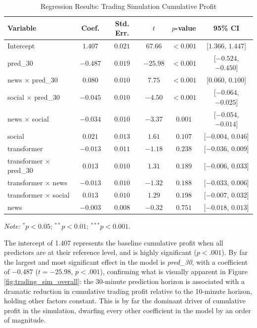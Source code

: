 \documentclass[stu,floatsintext]{apa7}
\begin{document}
\begin{table}[htbp]
\centering
\caption{Regression Results: Trading Simulation Cumulative Profit}
\label{tab:trading_sim_regression}
\begin{tabular}{lccccc}
\toprule
Variable & Coef. & Std. Err. & $t$ & $p$-value & 95\% CI \\
\midrule
Intercept                  & $1.407$  & $0.021$ & $67.66$  & $<0.001$\rlap{$^{***}$} & [$1.366$, $1.447$] \\
pred\_30                   & $-0.487$ & $0.019$ & $-25.98$ & $<0.001$\rlap{$^{***}$} & [$-0.524$, $-0.450$] \\
news $\times$ pred\_30     & $0.080$  & $0.010$ & $7.75$   & $<0.001$\rlap{$^{***}$} & [$0.060$, $0.100$] \\
social $\times$ pred\_30   & $-0.045$ & $0.010$ & $-4.50$  & $<0.001$\rlap{$^{***}$} & [$-0.064$, $-0.025$] \\
news $\times$ social       & $-0.034$ & $0.010$ & $-3.37$  & $0.001$\rlap{$^{***}$} & [$-0.054$, $-0.014$] \\
social                     & $0.021$  & $0.013$ & $1.61$   & $0.107$                & [$-0.004$, $0.046$] \\
transformer                & $-0.013$ & $0.011$ & $-1.18$  & $0.238$                & [$-0.036$, $0.009$] \\
transformer $\times$ pred\_30 & $0.013$  & $0.010$ & $1.31$   & $0.189$                & [$-0.006$, $0.033$] \\
transformer $\times$ news  & $-0.013$ & $0.010$ & $-1.32$  & $0.188$                & [$-0.033$, $0.006$] \\
transformer $\times$ social & $0.013$  & $0.010$ & $1.29$   & $0.198$                & [$-0.007$, $0.032$] \\
news                       & $-0.003$ & $0.008$ & $-0.32$  & $0.751$                & [$-0.018$, $0.013$] \\
\bottomrule
\end{tabular}
\begin{flushleft}
\footnotesize
\textit{Note:} $^{*}p<0.05$; $^{**}p<0.01$; $^{***}p<0.001$.
\end{flushleft}
\end{table}

The intercept of 1.407 represents the baseline cumulative profit when all predictors are at their reference level, and is highly significant ($p < .001$). By far the largest and most significant effect in the model is \textit{pred\_30}, with a coefficient of $-0.487$ ($t = -25.98$, $p < .001$), confirming what is visually apparent in Figure \ref{fig:trading_sim_overall}: the 30-minute prediction horizon is associated with a dramatic reduction in cumulative trading profit relative to the 10-minute horizon, holding other factors constant. This is by far the dominant driver of cumulative profit in the simulation, dwarfing every other coefficient in the model by an order of magnitude.
\end{document}
